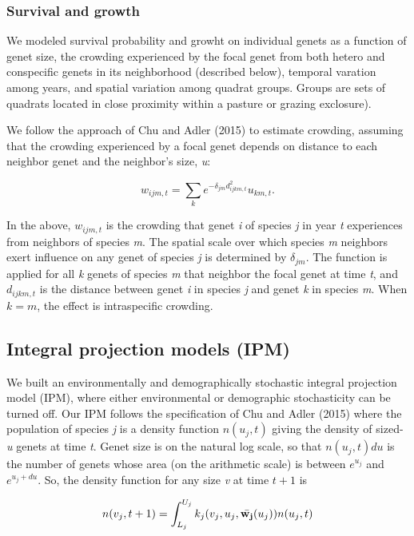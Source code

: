 \documentclass[12pt,]{article}
\begin{document}
\subsubsection{Survival and growth}\label{survival-and-growth}

We modeled survival probability and growht on individual genets as a
function of genet size, the crowding experienced by the focal genet from
both hetero and conspecific genets in its neighborhood (described
below), temporal varation among years, and spatial variation among
quadrat groups. Groups are sets of quadrats located in close proximity
within a pasture or grazing exclosure).

We follow the approach of Chu and Adler (2015) to estimate crowding,
assuming that the crowding experienced by a focal genet depends on
distance to each neighbor genet and the neighbor's size, \emph{u}:

\[
w_{ijm,t} = \sum_k e^{-\delta_{jm}d_{ijkm,t}^{2}}u_{km,t}.
\]

In the above, \(w_{ijm,t}\) is the crowding that genet \emph{i} of
species \emph{j} in year \emph{t} experiences from neighbors of species
\emph{m}. The spatial scale over which species \emph{m} neighbors exert
influence on any genet of species \emph{j} is determined by
\(\delta_{jm}\). The function is applied for all \emph{k} genets of
species \emph{m} that neighbor the focal genet at time \emph{t}, and
\(d_{ijkm,t}\) is the distance between genet \emph{i} in species
\emph{j} and genet \emph{k} in species \emph{m}. When \(k=m\), the
effect is intraspecific crowding.

\subsection{Integral projection models
(IPM)}\label{integral-projection-models-ipm}

We built an environmentally and demographically stochastic integral
projection model (IPM), where either environmental or demographic
stochasticity can be turned off. Our IPM follows the specification of
Chu and Adler (2015) where the population of species \emph{j} is a
density function \(n(u_{j},t)\) giving the density of sized-\emph{u}
genets at time \emph{t}. Genet size is on the natural log scale, so that
\(n(u_{j},t)du\) is the number of genets whose area (on the arithmetic
scale) is between \(e^{u_{j}}\) and \(e^{u_{j}+du}\). So, the density
function for any size \emph{v} at time \(t+1\) is

\[
n(v_{j},t+1) = \int_{L_{j}}^{U_{j}} k_{j}(v_{j},u_{j},\bar{\bold{w_{j}}}(u_{j}))n(u_{j},t)
\]
\end{document}

